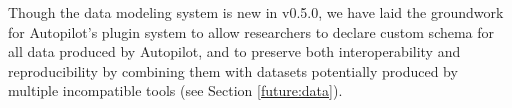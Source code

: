 Though the data modeling system is new in v0.5.0, we have laid the groundwork for Autopilot's plugin system to allow researchers to declare custom schema for all data produced by Autopilot, and to preserve both interoperability and reproducibility by combining them with datasets potentially produced by multiple incompatible tools (see Section \ref{future:data}).



